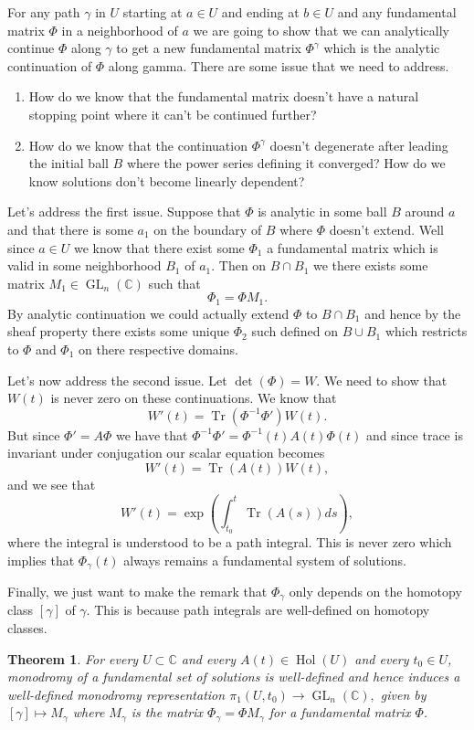 \documentclass[12pt]{book}
\numberwithin{equation}{section}
\newtheorem{theorem}{Theorem}[subsection]
\theoremstyle{definition}
\theoremstyle{remark}
\newcommand{\CC}{\mathbb{C}}
\newcommand{\hol}{\operatorname{Hol}}
\newcommand{\GL}{\operatorname{GL}}
\newcommand{\Tr}{\operatorname{Tr}}
\begin{document}
For any path $\gamma$ in $U$ starting at $a \in U$ and ending at $b\in U$ and any fundamental matrix $\Phi$ in a neighborhood of $a$ we are going to show that we can analytically continue $\Phi$ along $\gamma$ to get a new fundamental matrix $\Phi^{\gamma}$ which is the analytic continuation of $\Phi$ along gamma.
There are some issue that we need to address.
\begin{enumerate}
\item How do we know that the fundamental matrix doesn't have a natural stopping point where it can't be continued further?
\item How do we know that the continuation $\Phi^{\gamma}$ doesn't degenerate after leading the initial ball $B$ where the power series defining it converged? How do we know solutions don't become linearly dependent?
\end{enumerate}

Let's address the first issue. 
Suppose that $\Phi$ is analytic in some ball $B$ around $a$ and that there is some $a_1$ on the boundary of $B$ where $\Phi$ doesn't extend. 
Well since $a \in U$ we know that there exist some $\Phi_1$ a fundamental matrix which is valid in some neighborhood $B_1$ of $a_1$. 
Then on $B\cap B_1$ we there exists some matrix $M_1 \in \GL_n(\CC)$ such that 
 $$ \Phi_1 = \Phi M_1.$$
By analytic continuation we could actually extend $\Phi$ to $B\cap B_1$ and hence by the sheaf property there exists some unique $\Phi_2$ such defined on $B \cup B_1$ which restricts to $\Phi$ and $\Phi_1$ on there respective domains.

Let's now address the second issue. 
Let $\det(\Phi)=W$. 
We need to show that $W(t)$ is never zero on these continuations. 
We know that 
 $$ W'(t) = \Tr( \Phi^{-1} \Phi') W(t). $$
But since $\Phi' = A\Phi$ we have that $\Phi^{-1} \Phi' = \Phi^{-1}(t) A(t) \Phi(t)$ and since trace is invariant under conjugation our scalar equation becomes 
 $$ W'(t) = \Tr(A(t)) W(t), $$
and we see that 
 $$ W'(t) = \exp(\int_{t_0}^t \Tr(A(s)) ds),$$
where the integral is understood to be a path integral. 
This is never zero which implies that $\Phi_{\gamma}(t)$ always remains a fundamental system of solutions.

Finally, we just want to make the remark that $\Phi_{\gamma}$ only depends on the homotopy class $[\gamma]$ of $\gamma$. 
This is because path integrals are well-defined on homotopy classes.  



\begin{theorem}
For every $U \subset \CC$ and every $A(t) \in \hol(U)$ and every $t_0 \in U$, monodromy of a fundamental set of solutions is well-defined and hence induces a well-defined monodromy representation $ \pi_1(U,t_0) \to \GL_n(\CC),$ given by $[\gamma] \mapsto M_{\gamma}$ where $M_{\gamma}$ is the matrix  $\Phi_{\gamma}=\Phi M_{\gamma}$ for a fundamental matrix $\Phi$.
\end{theorem}
\end{document}

